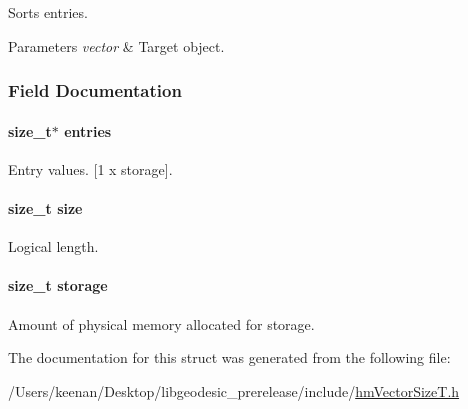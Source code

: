 Sorts entries. 


\begin{DoxyParams}{Parameters}
{\em vector} & Target object. \\
\hline
\end{DoxyParams}


\subsubsection{Field Documentation}
\hypertarget{structhm_vector_size_t_a80584cc4032a43c83261c16ace4513fc}{
\paragraph[{entries}]{\setlength{\rightskip}{0pt plus 5cm}size\-\_\-t$\ast$ entries}}\label{structhm_vector_size_t_a80584cc4032a43c83261c16ace4513fc}


Entry values. \mbox{[}1 x storage\mbox{]}. 

\hypertarget{structhm_vector_size_t_a854352f53b148adc24983a58a1866d66}{
\paragraph[{size}]{\setlength{\rightskip}{0pt plus 5cm}size\-\_\-t size}}\label{structhm_vector_size_t_a854352f53b148adc24983a58a1866d66}


Logical length. 

\hypertarget{structhm_vector_size_t_ad69ae78713b41381c4d71371aae6e63e}{
\paragraph[{storage}]{\setlength{\rightskip}{0pt plus 5cm}size\-\_\-t storage}}\label{structhm_vector_size_t_ad69ae78713b41381c4d71371aae6e63e}


Amount of physical memory allocated for storage. 



The documentation for this struct was generated from the following file\-:\begin{DoxyCompactItemize}
\item 
/\-Users/keenan/\-Desktop/libgeodesic\-\_\-prerelease/include/\hyperlink{hm_vector_size_t_8h}{hm\-Vector\-Size\-T.\-h}\end{DoxyCompactItemize}
